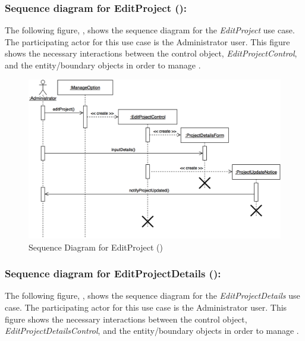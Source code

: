 \documentclass[12pt,letterpaper]{article}
\begin{document}
\subsubsection*{Sequence diagram for EditProject ():}

The following figure, , shows the sequence diagram for the {\it EditProject} use case. The participating actor for this use case is
the Administrator user. This figure shows the necessary interactions between the control object, {\it EditProjectControl}, and the
entity/boundary objects in order to manage .

\begin{figure}[H]
	\centering{}
	\includegraphics[scale=0.25]{imgs/seq/edit-project.png}
	\caption[ - Sequence Diagram for EditProject]{Sequence Diagram for EditProject ()}
\end{figure}

\subsubsection*{Sequence diagram for EditProjectDetails ():}

The following figure, , shows the sequence diagram for the {\it EditProjectDetails} use case. The participating actor for this use case is
the Administrator user. This figure shows the necessary interactions between the control object, {\it EditProjectDetailsControl}, and the
entity/boundary objects in order to manage .
\end{document}

